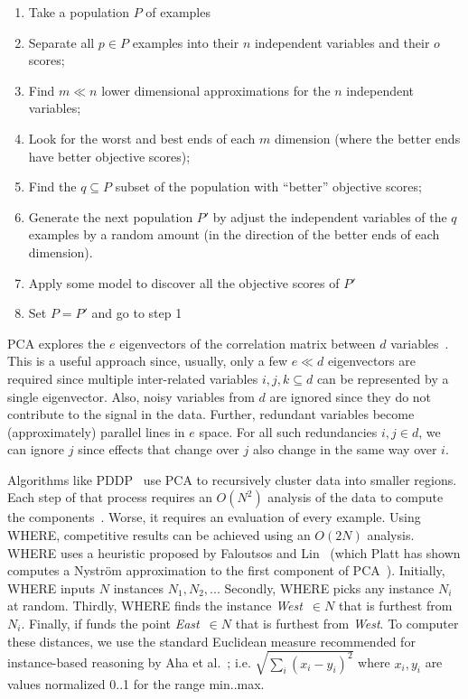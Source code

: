 \documentclass[conference]{IEEEtran}
\newcommand{\be}{\begin{enumerate}}
\newcommand{\ee}{\end{enumerate}}
\begin{document}
{\be
\item Take  a population $P$ of examples
\item Separate all $p \in P$ examples into their $n$ independent variables and 
their $o$ scores;
\item Find $m \ll n$ lower dimensional approximations for the $n$ independent variables;
\item Look for the worst and best ends of each $m$  dimension (where the better ends
have better objective scores);
\item Find the $q \subseteq P$ subset of the population with ``better'' objective scores;
\item Generate the next population $P'$ by adjust the independent variables
of the $q$  examples
by a random amount (in the direction of  the  better ends of each dimension).
\item Apply some model to discover all the objective scores of $P'$
\item Set $P=P'$ and go to step 1
\ee





PCA explores the $e$
eigenvectors of the correlation matrix between $d$
variables~\cite{pearson1901}.  
This is a useful approach since, usually,
only a few $e \ll d$ eigenvectors are required
since multiple inter-related variables $i,j,k \subseteq d$ can be represented
by a single  eigenvector.
Also, noisy variables from $d$ are
ignored since they  do not contribute to the signal in the data.
Further,
redundant  variables  become (approximately) parallel lines
in $e$ space. For all such redundancies \mbox{$i,j \in d$}, we
can ignore $j$
since effects that change over $j$ also
change in the same way over $i$.

Algorithms like PDDP~\cite{boley98} use PCA to
recursively cluster data into smaller regions. Each
step of that process requires an $O(N^2)$ analysis
of the data to compute the components~\cite{ilin10}. Worse, it requires an evaluation of every example.
Using WHERE, competitive results can be achieved
using an $O(2N)$ analysis.
WHERE uses a heuristic proposed by
Faloutsos and Lin~\cite{Faloutsos1995}
(which
Platt has
  shown computes a Nystr\"om
  approximation to the first component of
  PCA~\cite{platt05}).
Initially, WHERE inputs
$N$
instances $N_1,N_2,..$. Secondly, WHERE
picks any
instance $N_i$ at random. Thirdly, WHERE
finds the instance  {\em West}~$\in N$ that is
furthest from $N_i$. Finally,
if funds the point {\em East}~$\in N$ 
that is furthest from {\em West}. To computer these distances,
we use the standard Euclidean measure recommended for
instance-based reasoning by Aha et al.~\cite{aha91};
i.e. $\sqrt{\sum_i(x_i-y_i)^2}$ where $x_i,y_i$
are values normalized 0..1 for the range min..max.


}
\end{document}
